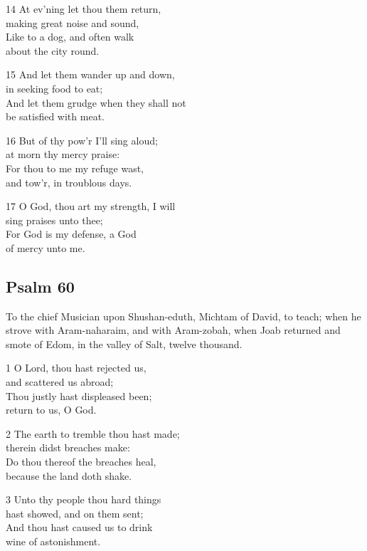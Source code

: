 \begin{multicols}{3}
14 At ev’ning let thou them return,\\
making great noise and sound,\\
Like to a dog, and often walk\\
about the city round.

15 And let them wander up and down,\\
in seeking food to eat;\\
And let them grudge when they shall not\\
be satisfied with meat.

16 But of thy pow’r I’ll sing aloud;\\
at morn thy mercy praise:\\
For thou to me my refuge wast,\\
and tow’r, in troublous days.

17 O God, thou art my strength, I will\\
sing praises unto thee;\\
For God is my defense, a God\\
of mercy unto me.

\begin{center}
\quad{}\quad{}
\end{center}

\subsection*{Psalm 60}
To the chief Musician upon Shushan-eduth, Michtam of David, to teach; when he strove with Aram-naharaim, and with Aram-zobah, when Joab returned and smote of Edom, in the valley of Salt, twelve thousand.

1 O Lord, thou hast rejected us,\\
and scattered us abroad;\\
Thou justly hast displeased been;\\
return to us, O God.

2 The earth to tremble thou hast made;\\
therein didst breaches make:\\
Do thou thereof the breaches heal,\\
because the land doth shake.

3 Unto thy people thou hard things\\
hast showed, and on them sent;\\
And thou hast caused us to drink\\
wine of astonishment.


\end{multicols}
